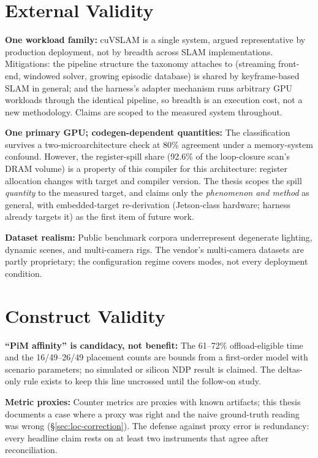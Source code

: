 \section{External Validity}

\textbf{One workload family:} cuVSLAM is a single system, argued representative by production deployment, not by breadth across SLAM implementations. Mitigations: the pipeline structure the taxonomy attaches to (streaming front-end, windowed solver, growing episodic database) is shared by keyframe-based SLAM in general; and the harness's adapter mechanism runs arbitrary GPU workloads through the identical pipeline, so breadth is an execution cost, not a new methodology. Claims are scoped to the measured system throughout.

\textbf{One primary GPU; codegen-dependent quantities:} The classification survives a two-microarchitecture check at 80\% agreement under a memory-system confound. However, the register-spill share (92.6\% of the loop-closure scan's DRAM volume) is a property of this compiler for this architecture: register allocation changes with target and compiler version. The thesis scopes the spill \emph{quantity} to the measured target, and claims only the \emph{phenomenon and method} as general, with embedded-target re-derivation (Jetson-class hardware; harness already targets it) as the first item of future work.

\textbf{Dataset realism:} Public benchmark corpora underrepresent degenerate lighting, dynamic scenes, and multi-camera rigs. The vendor's multi-camera datasets are partly proprietary; the configuration regime covers modes, not every deployment condition.

\section{Construct Validity}

\textbf{“PiM affinity” is candidacy, not benefit:} The 61--72\% offload-eligible time and the 16/49--26/49 placement counts are bounds from a first-order model with scenario parameters; no simulated or silicon NDP result is claimed. The deltas-only rule exists to keep this line uncrossed until the follow-on study.

\textbf{Metric proxies:} Counter metrics are proxies with known artifacts; this thesis documents a case where a proxy was right and the naive ground-truth reading was wrong (\S\ref{sec:loc-correction}). The defense against proxy error is redundancy: every headline claim rests on at least two instruments that agree after reconciliation.

